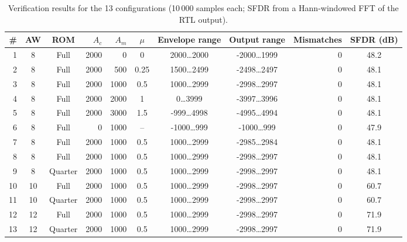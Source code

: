 \begin{table}[t]
\caption{Verification results for the 13 configurations (10\,000 samples each; SFDR from a Hann-windowed FFT of the RTL output).}
\label{tab:cases}
\centering
\small
\begin{tabular}{@{}rccrrcccrc@{}}
\toprule
\# & AW & ROM & $A_c$ & $A_m$ & $\mu$ & Envelope range & Output range & Mismatches & SFDR (dB)\\
\midrule
1 & 8 & Full & 2000 & 0 & 0 & 2000\ldots2000 & -2000\ldots1999 & 0 & 48.2\\
2 & 8 & Full & 2000 & 500 & 0.25 & 1500\ldots2499 & -2498\ldots2497 & 0 & 48.1\\
3 & 8 & Full & 2000 & 1000 & 0.5 & 1000\ldots2999 & -2998\ldots2997 & 0 & 48.1\\
4 & 8 & Full & 2000 & 2000 & 1 & 0\ldots3999 & -3997\ldots3996 & 0 & 48.1\\
5 & 8 & Full & 2000 & 3000 & 1.5 & -999\ldots4998 & -4995\ldots4994 & 0 & 48.1\\
6 & 8 & Full & 0 & 1000 & -- & -1000\ldots999 & -1000\ldots999 & 0 & 47.9\\
7 & 8 & Full & 2000 & 1000 & 0.5 & 1000\ldots2999 & -2985\ldots2984 & 0 & 48.1\\
8 & 8 & Full & 2000 & 1000 & 0.5 & 1000\ldots2999 & -2998\ldots2997 & 0 & 48.1\\
9 & 8 & Quarter & 2000 & 1000 & 0.5 & 1000\ldots2999 & -2998\ldots2997 & 0 & 48.1\\
10 & 10 & Full & 2000 & 1000 & 0.5 & 1000\ldots2999 & -2998\ldots2997 & 0 & 60.7\\
11 & 10 & Quarter & 2000 & 1000 & 0.5 & 1000\ldots2999 & -2998\ldots2997 & 0 & 60.7\\
12 & 12 & Full & 2000 & 1000 & 0.5 & 1000\ldots2999 & -2998\ldots2997 & 0 & 71.9\\
13 & 12 & Quarter & 2000 & 1000 & 0.5 & 1000\ldots2999 & -2998\ldots2997 & 0 & 71.9\\
\bottomrule
\end{tabular}
\end{table}
